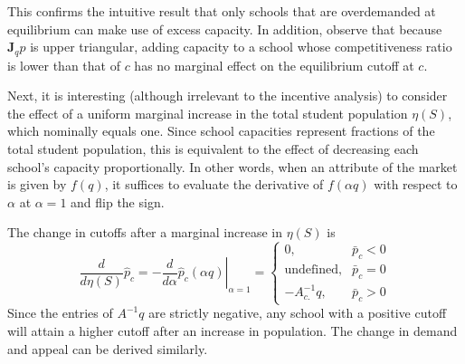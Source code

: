 \documentclass[12pt]{article}
\theoremstyle{definition}
\begin{document}
This confirms the intuitive result that only schools that are overdemanded at equilibrium can make use of excess capacity. In addition, observe that because $\mathbf{J}_q \hat p$ is upper triangular, adding capacity to a school whose competitiveness ratio is lower than that of $c$ has no marginal effect on the equilibrium cutoff at $c$. 

Next, it is interesting (although irrelevant to the incentive analysis) to consider the effect of a uniform marginal increase in the total student population $\eta(S)$, which nominally equals one. Since school capacities represent fractions of the total student population, this is equivalent to the effect of decreasing each school's capacity proportionally. In other words, when an attribute of the market is given by $f(q)$, it suffices to evaluate the derivative of $f(\alpha q)$ with respect to $\alpha$ at $\alpha =1$ and flip the sign.

The change in cutoffs after a marginal increase in $\eta(S)$ is
\begin{equation}\label{d-population-p}
\frac{d}{{d}\eta(S)} \hat p_c = 
- \left.\frac{{d}}{{d}\alpha} \hat p_c(\alpha q)\right|_{\alpha=1} = \begin{cases}
0, & \bar p_c < 0 \\
\text{undefined}, & \bar p_c = 0 \\
-A^{-1}_{c .} q, & \bar p_c > 0
\end{cases}
\end{equation}
Since the entries of $A^{-1}q$ are strictly negative, any school with a positive cutoff will attain a higher cutoff after an increase in population. The change in demand and appeal can be derived similarly. 


\end{document}
